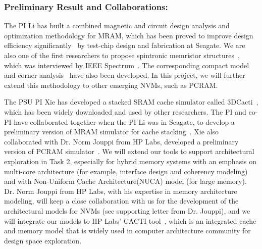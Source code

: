 \subsubsection{Preliminary Result and Collaborations:}
The PI Li has built a combined magnetic and circuit design analysis and optimization methodology for MRAM, which has been proved to improve design efficiency significantly~\cite{Chen08} by test-chip design and fabrication at Seagate. We are also one of the first researchers to propose spintronic memristor structures~\cite{Wang09}, which was interviewed by IEEE Spectrum~\cite{Spectrum09}. The corresponding compact model and corner analysis~\cite{Chen09} have also been developed. In this project, we will further extend this methodology to other emerging NVMs, such as PCRAM.

The PSU PI Xie has developed a stacked SRAM cache
simulator called 3DCacti~\cite{xie:iccd05-3d, XIE:TVLSI2008-3DCacti},
which has been widely downloaded and used by other researchers.
The PI and co-PI have collaborated together when the PI Li was in Seagate,
to develop a preliminary version of MRAM simulator for cache stacking~\cite{MRAM:DONG08,XIE:HPCA09}.
Xie also collaborated with Dr. Norm Jouppi
from HP Labs, developed a preliminary version of PCRAM simulator~\cite{xie:pcramsim}.
We will extend our tools to support architectural exploration in Task 2, especially
for hybrid memory systems with an emphasis on multi-core architecture
(for example, interface design and coherency modeling)
and with Non-Uniform Cache Architecture(NUCA) model (for large
memory). Dr. Norm Jouppi from HP Labs,
with his expertise in memory architecture modeling, will keep a close
collaboration with us for the development of the architectural models for NVMs (see supporting letter
from Dr. Jouppi), and we will integrate our models to HP Labs' CACTI tool~\cite{CACTI}, which is an integrated cache and memory model that is widely used in computer architecture community for design space exploration.

